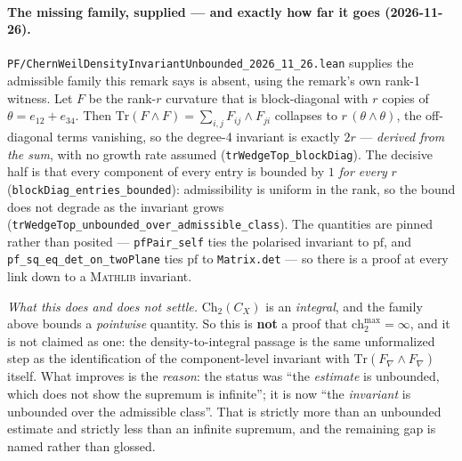 \begin{remark}
\paragraph{The missing family, supplied --- and exactly how far it goes
(2026-11-26).}
\texttt{PF/ChernWeilDensityInvariantUnbounded\_2026\_11\_26.lean} supplies the
admissible family this remark says is absent, using the remark's own rank-1
witness. Let $F$ be the rank-$r$ curvature that is block-diagonal with $r$
copies of $\theta = e_{12} + e_{34}$. Then
$\mathrm{Tr}(F\wedge F) = \sum_{i,j} F_{ij}\wedge F_{ji}$ collapses to
$r\,(\theta\wedge\theta)$, the off-diagonal terms vanishing, so the degree-4
invariant is exactly $2r$ --- \emph{derived from the sum}, with no growth rate
assumed (\texttt{trWedgeTop\_blockDiag}). The decisive half is that every
component of every entry is bounded by $1$ \emph{for every} $r$
(\texttt{blockDiag\_entries\_bounded}): admissibility is uniform in the rank, so
the bound does not degrade as the invariant grows
(\texttt{trWedgeTop\_unbounded\_over\_admissible\_class}). The quantities are
pinned rather than posited --- \texttt{pfPair\_self} ties the polarised
invariant to $\mathrm{pf}$, and \texttt{pf\_sq\_eq\_det\_on\_twoPlane} ties
$\mathrm{pf}$ to \texttt{Matrix.det} --- so there is a proof at every link down
to a \textsc{Mathlib} invariant.

\emph{What this does and does not settle.} $\mathrm{Ch}_2(C_X)$ is an
\emph{integral}, and the family above bounds a \emph{pointwise} quantity. So
this is \textbf{not} a proof that $\text{ch}_2^{\max} = \infty$, and it is not
claimed as one: the density-to-integral passage is the same unformalized step as
the identification of the component-level invariant with
$\mathrm{Tr}(F_\nabla \wedge F_\nabla)$ itself. What improves is the
\emph{reason}: the status was ``the \emph{estimate} is unbounded, which does not
show the supremum is infinite''; it is now ``the \emph{invariant} is unbounded
over the admissible class''. That is strictly more than an unbounded estimate
and strictly less than an infinite supremum, and the remaining gap is named
rather than glossed.


\end{remark}
